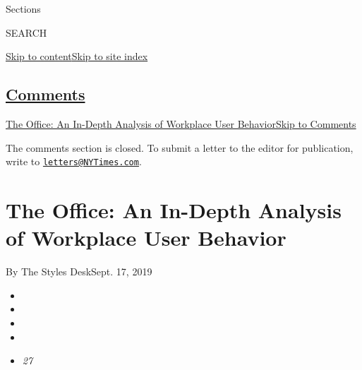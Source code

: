Sections

SEARCH

\protect\hyperlink{site-content}{Skip to
content}\protect\hyperlink{site-index}{Skip to site index}

\hypertarget{comments}{%
\subsection{\texorpdfstring{\protect\hyperlink{commentsContainer}{Comments}}{Comments}}\label{comments}}

\href{}{The Office: An In-Depth Analysis of Workplace User
Behavior}\href{}{Skip to Comments}

The comments section is closed. To submit a letter to the editor for
publication, write to
\href{mailto:letters@NYTimes.com}{\nolinkurl{letters@NYTimes.com}}.

\hypertarget{the-office-an-in-depth-analysis-of-workplace-user-behavior}{%
\section{The Office: An In-Depth Analysis of Workplace User
Behavior}\label{the-office-an-in-depth-analysis-of-workplace-user-behavior}}

By The Styles DeskSept. 17, 2019

\begin{itemize}
\item
\item
\item
\item
\item
  \emph{27}
\end{itemize}

